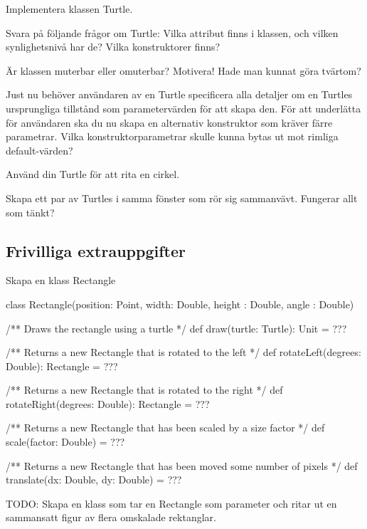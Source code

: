 \Subtask Implementera klassen Turtle.

\Subtask Svara på följande frågor om Turtle: Vilka attribut finns i klassen, och vilken synlighetsnivå har de? Vilka konstruktorer finns? 

\Subtask Är klassen muterbar eller omuterbar? Motivera! Hade man kunnat göra tvärtom?

\Subtask Just nu behöver användaren av en Turtle specificera alla detaljer om en Turtles ursprungliga tillstånd som parametervärden för att skapa den. För att underlätta för användaren ska du nu skapa en alternativ konstruktor som kräver färre parametrar. Vilka konstruktorparametrar skulle kunna bytas ut mot rimliga default-värden?

\Subtask Använd din Turtle för att rita en cirkel.

\Subtask Skapa ett par av Turtles i samma fönster som rör sig sammanvävt. Fungerar allt som tänkt?

\subsection{Frivilliga extrauppgifter}

\Task Skapa en klass Rectangle
\begin{ScalaSpec}
class Rectangle(position: Point, width: Double, height : Double, angle : Double) {
  /** Draws the rectangle using a turtle */
  def draw(turtle: Turtle): Unit = ???

  /** Returns a new Rectangle that is rotated to the left */
  def rotateLeft(degrees: Double): Rectangle = ???

  /** Returns a new Rectangle that is rotated to the right */
  def rotateRight(degrees: Double): Rectangle = ???

  /** Returns a new Rectangle that has been scaled by a size factor */
  def scale(factor: Double) = ???

  /** Returns a new Rectangle that has been moved some number of pixels */
  def translate(dx: Double, dy: Double) = ???
}
\end{ScalaSpec}

\Task TODO: Skapa en klass som tar en Rectangle som parameter och ritar ut en sammansatt figur av flera omskalade rektanglar.
